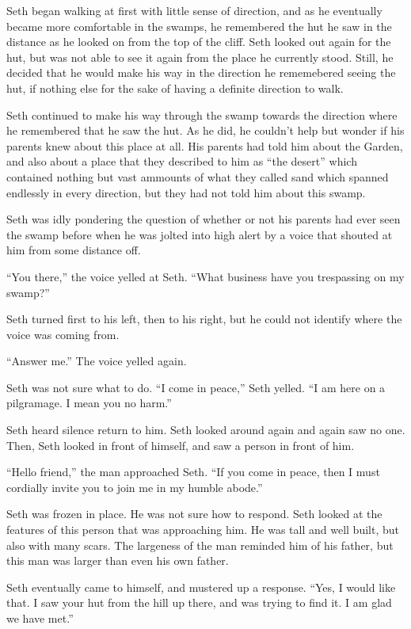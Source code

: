 \documentclass[12pt,twoside,titlepage]{report}
\begin{document}
Seth began walking at first with little sense of direction, and as he
eventually became more comfortable in the swamps, he remembered the hut
he saw in the distance as he looked on from the top of the cliff. Seth
looked out again for the hut, but was not able to see it again from the
place he currently stood. Still, he decided that he would make his way
in the direction he rememebered seeing the hut, if nothing else for the
sake of having a definite direction to walk.

Seth continued to make his way through the swamp towards the direction
where he remembered that he saw the hut. As he did, he couldn't help but
wonder if his parents knew about this place at all. His parents had told
him about the Garden, and also about a place that they described to him
as ``the desert'' which contained nothing but vast ammounts of what they
called sand which spanned endlessly in every direction, but they had not
told him about this swamp.

Seth was idly pondering the question of whether or not his parents had
ever seen the swamp before when he was jolted into high alert by a voice
that shouted at him from some distance off.

``You there,'' the voice yelled at Seth. ``What business have you
trespassing on my swamp?''

Seth turned first to his left, then to his right, but he could not
identify where the voice was coming from.

``Answer me.'' The voice yelled again.

Seth was not sure what to do. ``I come in peace,'' Seth yelled. ``I am
here on a pilgramage. I mean you no harm.''

Seth heard silence return to him. Seth looked around again and again saw
no one. Then, Seth looked in front of himself, and saw a person in front
of him.

``Hello friend,'' the man approached Seth. ``If you come in peace, then
I must cordially invite you to join me in my humble abode.''

Seth was frozen in place. He was not sure how to respond. Seth looked at
the features of this person that was approaching him. He was tall and
well built, but also with many scars. The largeness of the man reminded
him of his father, but this man was larger than even his own father.

Seth eventually came to himself, and mustered up a response. ``Yes, I
would like that. I saw your hut from the hill up there, and was trying
to find it. I am glad we have met.''
\end{document}
